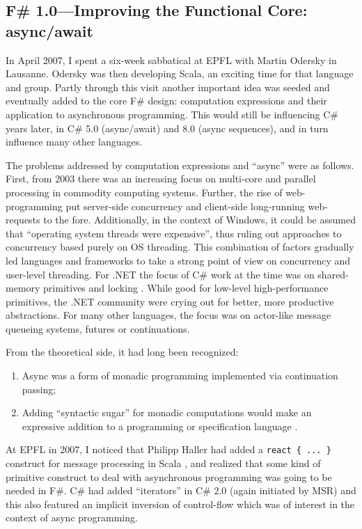 \documentclass[acmsmall]{acmart}\settopmatter{}
\begin{document}
\subsection*{F\# 1.0---Improving the Functional Core: async/await}

In April 2007, I spent a six-week sabbatical at EPFL with Martin Odersky in Lausanne.  Odersky was then developing Scala, an exciting time for that language and group. Partly through this visit another important idea was seeded and eventually added to the core F\# design: computation expressions and their application to asynchronous programming.  This would still be influencing C\# years later, in C\# 5.0 (async/await) and 8.0 (async sequences), and in turn influence many other languages. 

The problems addressed by computation expressions and “async” were as follows.  First, from 2003 there was an increasing focus on multi-core and parallel processing in commodity computing systems. Further, the rise of web-programming put server-side concurrency and client-side long-running web-requests to the fore. Additionally, in the context of Windows, it could be assumed that “operating system threads were expensive”, thus ruling out approaches to concurrency based purely on OS threading.  This combination of factors gradually led languages and frameworks to take a strong point of view on concurrency and user-level threading.  For .NET the focus of C\# work at the time was on shared-memory primitives and locking \citep{Duffy2008concurrent}. While good for low-level high-performance primitives, the .NET community were crying out for better, more productive abstractions.  For many other languages, the focus was on actor-like message queueing systems, futures or continuations.  

From the theoretical side, it had long been recognized:

\begin{enumerate}
\item Async was a form of monadic programming \citep{citeulike:2104808} implemented via continuation passing;
\item Adding “syntactic sugar” for monadic computations would make an expressive addition to a programming or specification language \citep{HistoryOfHaskell}.
\end{enumerate}


At EPFL in 2007, I noticed that Philipp Haller had added a \texttt{react \{ ... \}} construct for message processing in Scala \citep{Haller2009}, and
realized that some kind of primitive construct to deal with asynchronous programming was going to be needed in F\#.  C\# had added ``iterators''
in C\# 2.0 (again initiated by MSR) and this also featured an implicit inversion of control-flow which was of interest in the context of async programming.
\end{document}
